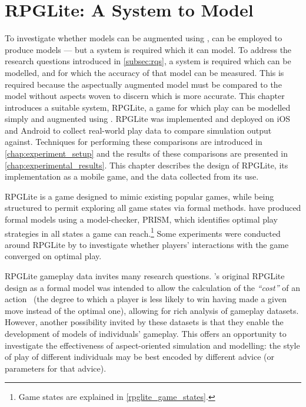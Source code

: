 \chapter{RPGLite: A System to Model}\label{chap:rpglite}



To investigate whether models can be augmented using \aop{}, \pdsf{} can be
employed to produce \aspectoriented{} models --- but a system is required which
it can model. To address the research questions introduced in \cref{subsec:rqs},
a system is required which can be modelled, and for which the accuracy of that
model can be measured. This is required because the aspectually augmented model
must be compared to the model without aspects woven to discern which is more
accurate. This chapter introduces a suitable system, RPGLite, a game for which
play can be modelled simply and augmented using \aop{}. RPGLite was implemented
and deployed on iOS and Android to collect real-world play data to compare
simulation output against. Techniques for performing these comparisons are
introduced in \cref{chap:experiment_setup} and the results of these comparisons
are presented in \cref{chap:experimental_results}. This chapter describes the
design of RPGLite, its implementation as a mobile game, and the data collected
from its use.

 RPGLite is a game designed to mimic existing popular games, while being
structured to permit exploring all game states via formal methods.
\citet{kavanagh2020} have produced formal models using a model-checker, PRISM,
which identifies optimal play strategies in all states a game can
reach.\footnote{Game states are explained in \cref{rpglite_game_states}.} Some
experiments were conducted around RPGLite by \citet{kavanagh2021thesis} to
investigate whether players' interactions with the game converged on optimal
play.

RPGLite gameplay data invites many research questions.
\citeauthor{kavanagh2020}'s original RPGLite design as a formal model was
intended to allow the calculation of the \emph{``cost''} of an
action~\cite{kavanagh2020,kavanagh2021thesis} (the degree to which a player is
less likely to win having made a given move instead of the optimal one),
allowing for rich analysis of gameplay datasets. However, another possibility
invited by these datasets is that they enable the development of models of
individuals' gameplay. This offers an opportunity to investigate the
effectiveness of aspect-oriented simulation and modelling: the style of play of
different individuals may be best encoded by different advice (or parameters for
that advice).

